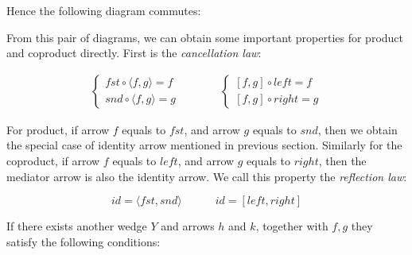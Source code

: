 \documentclass{article}
\begin{document}
Hence the following diagram commutes:

\begin{center}
\end{center}

From this pair of diagrams, we can obtain some important properties for product and coproduct directly. First is the {\em cancellation law}:

\[
\begin{array}{rcl}
\begin{cases}
fst \circ \langle f, g \rangle = f \\
snd \circ \langle f, g \rangle = g
\end{cases}
& \quad \quad &
\begin{cases}
[f, g] \circ left = f \\
[f, g] \circ right = g
\end{cases}
\end{array}
\]

For product, if arrow $f$ equals to $fst$, and arrow $g$ equals to $snd$, then we obtain the special case of identity arrow mentioned in previous section. Similarly for the coproduct, if arrow $f$ equals to $left$, and arrow $g$ equals to $right$, then the mediator arrow is also the identity arrow. We call this property the {\em reflection law}:

\[
id = \langle fst, snd \rangle \quad \quad \quad id = [left, right]
\]

If there exists another wedge $Y$ and arrows $h$ and $k$, together with $f, g$ they satisfy the following conditions:
\end{document}
